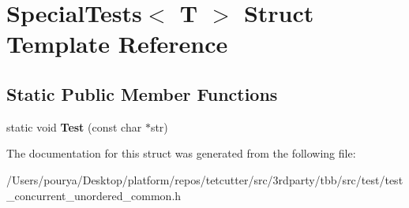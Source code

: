 \hypertarget{structSpecialTests}{}\section{Special\+Tests$<$ T $>$ Struct Template Reference}
\label{structSpecialTests}
\subsection*{Static Public Member Functions}
\begin{DoxyCompactItemize}
\item 
\hypertarget{structSpecialTests_ad612a6badcc13350449b244f3a62d9e0}{}static void {\bfseries Test} (const char $\ast$str)\label{structSpecialTests_ad612a6badcc13350449b244f3a62d9e0}

\end{DoxyCompactItemize}


The documentation for this struct was generated from the following file\+:\begin{DoxyCompactItemize}
\item 
/\+Users/pourya/\+Desktop/platform/repos/tetcutter/src/3rdparty/tbb/src/test/test\+\_\+concurrent\+\_\+unordered\+\_\+common.\+h\end{DoxyCompactItemize}
